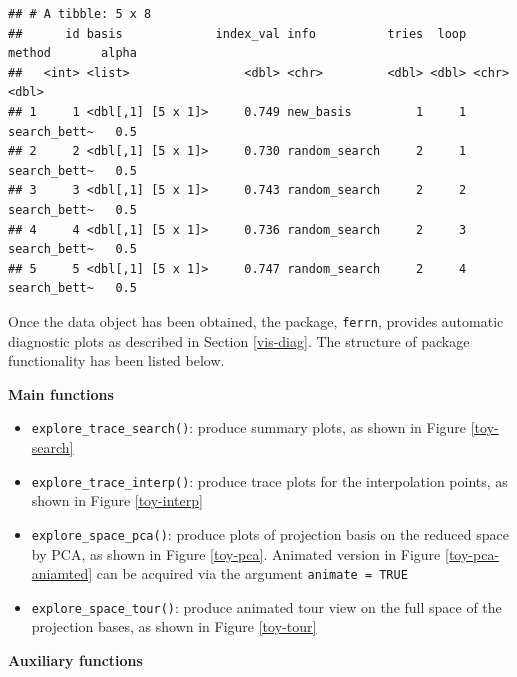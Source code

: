 \documentclass[12pt]{article}
\providecommand{\tightlist}{%
  \setlength{\itemsep}{0pt}\setlength{\parskip}{0pt}}
\begin{document}
\begin{verbatim}
## # A tibble: 5 x 8
##      id basis             index_val info          tries  loop method       alpha
##   <int> <list>                <dbl> <chr>         <dbl> <dbl> <chr>        <dbl>
## 1     1 <dbl[,1] [5 x 1]>     0.749 new_basis         1     1 search_bett~   0.5
## 2     2 <dbl[,1] [5 x 1]>     0.730 random_search     2     1 search_bett~   0.5
## 3     3 <dbl[,1] [5 x 1]>     0.743 random_search     2     2 search_bett~   0.5
## 4     4 <dbl[,1] [5 x 1]>     0.736 random_search     2     3 search_bett~   0.5
## 5     5 <dbl[,1] [5 x 1]>     0.747 random_search     2     4 search_bett~   0.5
\end{verbatim}

Once the data object has been obtained, the package, \texttt{ferrn}, provides automatic diagnostic plots as described in Section \ref{vis-diag}. The structure of package functionality has been listed below.

\textbf{Main functions}

\begin{itemize}
\tightlist
\item
  \texttt{explore\_trace\_search()}: produce summary plots, as shown in Figure \ref{toy-search}
\item
  \texttt{explore\_trace\_interp()}: produce trace plots for the interpolation points, as shown in Figure \ref{toy-interp}
\item
  \texttt{explore\_space\_pca()}: produce plots of projection basis on the reduced space by PCA, as shown in Figure \ref{toy-pca}. Animated version in Figure \ref{toy-pca-aniamted} can be acquired via the argument \texttt{animate\ =\ TRUE}
\item
  \texttt{explore\_space\_tour()}: produce animated tour view on the full space of the projection bases, as shown in Figure \ref{toy-tour}
\end{itemize}

\textbf{Auxiliary functions}
\end{document}
